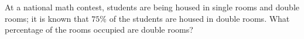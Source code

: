 At a national math contest, students are being housed in single rooms and double rooms; it is known that $75\%$ of the students are housed in double rooms. What percentage of the rooms occupied are double rooms?

